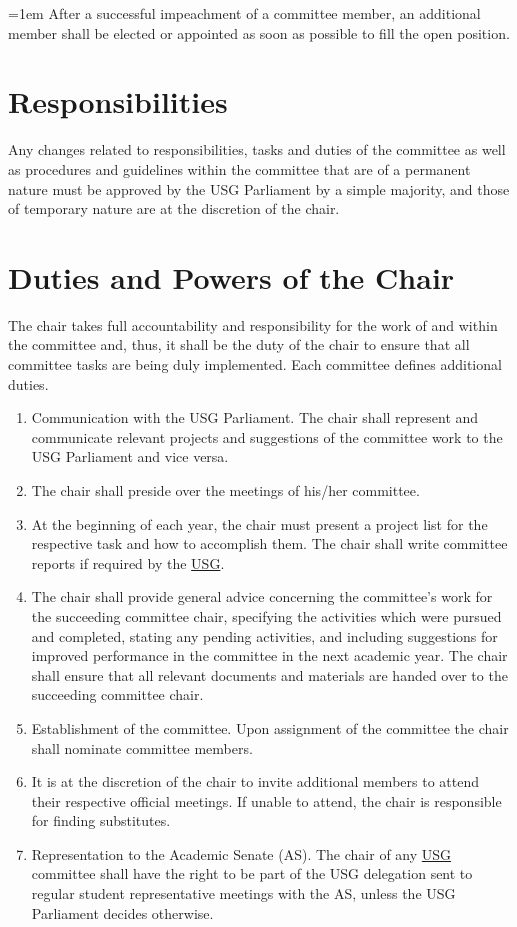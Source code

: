 \documentclass[12pt]{LaTeX_Misc/constitution}
\begin{document}
{\parindent=1em
After a successful impeachment of a committee member, an additional member shall be elected or appointed as soon as possible to fill the open position.}

\section{Responsibilities}
Any changes related to responsibilities, tasks and duties of the committee as well as procedures and guidelines within the committee that are of a permanent nature must be approved by the USG Parliament by a simple majority, and those of temporary nature are at the discretion of the chair.

\section{Duties and Powers of the Chair}
The chair takes full accountability and responsibility for the work of and within the committee and, thus, it shall be the duty of the chair to ensure that all committee tasks are being duly implemented. Each committee defines additional duties.

\begin{enumerate}[label={\textbf{\S\arabic*}}]
\item Communication with the USG Parliament. The chair shall represent and communicate relevant projects and suggestions of the committee work to the USG Parliament and vice versa. 

\item The chair shall preside over the meetings of his/her committee.

\item At the beginning of each year, the chair must present a project list for the respective task and how to accomplish them. The chair shall write committee reports if required by the \hyperref[USGdef]{USG}.

\item The chair shall provide general advice concerning the committee's work for the succeeding committee chair, specifying the activities which were pursued and completed, stating any pending activities, and including suggestions for improved performance in the committee in the next academic year. The chair shall ensure that all relevant documents and materials are handed over to the succeeding committee chair. 

\item Establishment of the committee. Upon assignment of the committee the chair shall nominate committee members. 

\item It is at the discretion of the chair to invite additional members to attend their respective official meetings. If unable to attend, the chair is responsible for finding substitutes.

\item Representation to the Academic Senate (AS). The chair of any \hyperref[USGdef]{USG} committee shall have the right to be part of the USG delegation sent to regular student representative meetings with the AS, unless the USG Parliament decides otherwise.
\end{enumerate}
\end{document}
